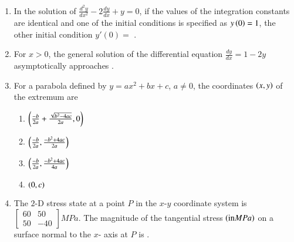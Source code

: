 \documentclass[journal,12pt,onecolumn]{IEEEtran}
\theoremstyle{remark}
\begin{document}
\begin{enumerate}
\item In the solution of $\frac{d^2y}{dx^2}-2\frac{dy}{dx}+y=0$, if the values of the integration constants are identical and one of the initial conditions is specified as $y\left(0\right)=1$, the other initial condition $y'(0)=$ \underline{\hspace{2cm}}.

\item For $x>0$, the general solution of the differential equation $\frac{dy}{dx}=1-2y$ asymptotically approaches \underline{\hspace{2cm}}.

\item For a parabola defined by $y=ax^2 + bx + c$, $a \neq 0$, the coordinates $\left(x,y\right)$ of the extremum are 

\begin{enumerate}
	\item $\left( \frac{-b}{2a}+\frac{\sqrt{b^2-4ac}}{2a}, 0\right)$
	\item $\left( \frac{-b}{2a}, \frac{-b^2+4ac}{2a}\right)$
	\item $\left( \frac{-b}{2a}, \frac{-b^2+4ac}{4a}\right)$
	\item $\left(0,c\right)$
\end{enumerate}

\item The $2$-D stress state at a point $P$ in the $x$-$y$ coordinate system is $\begin{bmatrix} 60 & 50 \\ 50 & -40 \end{bmatrix} MPa$. The magnitude of the tangential stress $\left(\text{in} MPa\right)$ on a surface normal to the $x$- axis at $P$ is \underline{\hspace{2cm}}.

\end{enumerate}
\end{document}
